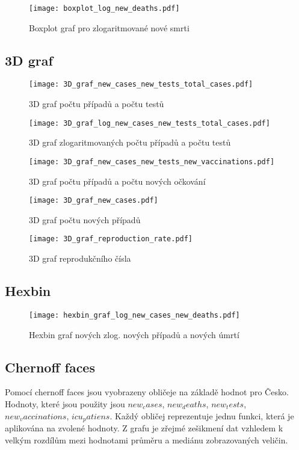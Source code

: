 \documentclass[a4paper, 12pt]{article}
\begin{document}
\begin{figure}[H]
\centering

\texttt{[image: boxplot\_log\_new\_deaths.pdf]}
\caption{Boxplot graf pro zlogaritmované nové smrti}
\end{figure}

\subsection{3D graf}
\begin{figure}[H]
\centering

\texttt{[image: 3D\_graf\_new\_cases\_new\_tests\_total\_cases.pdf]}
\caption{3D graf počtu případů a počtu testů}

\texttt{[image: 3D\_graf\_log\_new\_cases\_new\_tests\_total\_cases.pdf]}
\caption{3D graf zlogaritmovaných počtu případů a počtu testů}

\end{figure}
\begin{figure}[H]

\texttt{[image: 3D\_graf\_new\_cases\_new\_tests\_new\_vaccinations.pdf]}
\caption{3D graf počtu případů a počtu nových očkování}

\texttt{[image: 3D\_graf\_new\_cases.pdf]}
\caption{3D graf počtu nových případů}

\end{figure}
\begin{figure}[H]

\texttt{[image: 3D\_graf\_reproduction\_rate.pdf]}
\caption{3D graf reprodukčního čísla}

\end{figure}

\subsection{Hexbin}
\begin{figure}[H]
\centering

\texttt{[image: hexbin\_graf\_log\_new\_cases\_new\_deaths.pdf]}
\caption{Hexbin graf nových zlog. nových případů a nových úmrtí}

\end{figure}
\clearpage

\subsection{Chernoff faces}

Pomocí chernoff faces jsou vyobrazeny obličeje na základě hodnot pro Česko. Hodnoty, které jsou použity jsou
$new_cases$, $new_deaths$, $new_tests$, $new_vaccinations$, $icu_patiens$. Každý obličej reprezentuje jednu funkci, která
je aplikována na zvolené hodnoty. Z grafu je zřejmé zešikmení dat vzhledem k velkým rozdílům mezi hodnotami průměru
a mediánu zobrazovaných veličin.
\end{document}

